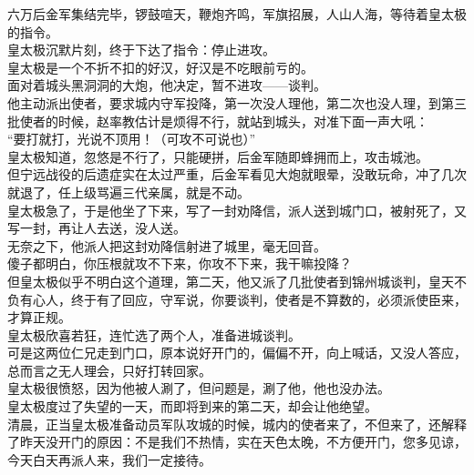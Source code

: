 \begin{multicols}{\theparacolNo}
六万后金军集结完毕，锣鼓喧天，鞭炮齐鸣，军旗招展，人山人海，等待着皇太极的指令。\\

皇太极沉默片刻，终于下达了指令：停止进攻。\\

皇太极是一个不折不扣的好汉，好汉是不吃眼前亏的。\\

面对着城头黑洞洞的大炮，他决定，暂不进攻——谈判。\\

他主动派出使者，要求城内守军投降，第一次没人理他，第二次也没人理，到第三批使者的时候，赵率教估计是烦得不行，就站到城头，对准下面一声大吼：\\

“要打就打，光说不顶用！（可攻不可说也）”\\

皇太极知道，忽悠是不行了，只能硬拼，后金军随即蜂拥而上，攻击城池。\\

但宁远战役的后遗症实在太过严重，后金军看见大炮就眼晕，没敢玩命，冲了几次就退了，任上级骂遍三代亲属，就是不动。\\

皇太极急了，于是他坐了下来，写了一封劝降信，派人送到城门口，被射死了，又写一封，再让人去送，没人送。\\

无奈之下，他派人把这封劝降信射进了城里，毫无回音。\\

傻子都明白，你压根就攻不下来，你攻不下来，我干嘛投降？\\

但皇太极似乎不明白这个道理，第二天，他又派了几批使者到锦州城谈判，皇天不负有心人，终于有了回应，守军说，你要谈判，使者是不算数的，必须派使臣来，才算正规。\\

皇太极欣喜若狂，连忙选了两个人，准备进城谈判。\\

可是这两位仁兄走到门口，原本说好开门的，偏偏不开，向上喊话，又没人答应，总而言之无人理会，只好打转回家。\\

皇太极很愤怒，因为他被人涮了，但问题是，涮了他，他也没办法。\\

皇太极度过了失望的一天，而即将到来的第二天，却会让他绝望。\\

清晨，正当皇太极准备动员军队攻城的时候，城内的使者来了，不但来了，还解释了昨天没开门的原因：不是我们不热情，实在天色太晚，不方便开门，您多见谅，今天白天再派人来，我们一定接待。\\


\end{multicols}
